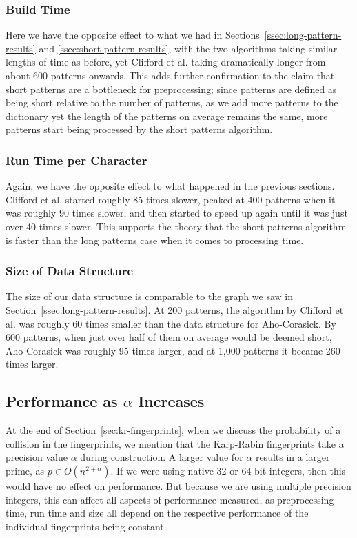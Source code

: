 \documentclass[ %
                    author={Dominic Joseph Moylett},
                    degree={MEng},
                     title={Dictionary Matching with Fingerprints},
                  subtitle={An Empirical Analysis},
                      type={research},
                      year={2015} ]{dissertation}
\begin{document}
\subsubsection{Build Time}

Here we have the opposite effect to what we had in Sections~\ref{ssec:long-pattern-results} and \ref{ssec:short-pattern-results}, with the two algorithms taking similar lengths of time as before, yet Clifford et al. taking dramatically longer from about 600 patterns onwards. This adds further confirmation to the claim that short patterns are a bottleneck for preprocessing; since patterns are defined as being short relative to the number of patterns, as we add more patterns to the dictionary yet the length of the patterns on average remains the same, more patterns start being processed by the short patterns algorithm.

\subsubsection{Run Time per Character}

Again, we have the opposite effect to what happened in the previous sections. Clifford et al. started roughly 85 times slower, peaked at 400 patterns when it was roughly 90 times slower, and then started to speed up again until it was just over 40 times slower. This supports the theory that the short patterns algorithm is faster than the long patterns case when it comes to processing time.

\subsubsection{Size of Data Structure}

The size of our data structure is comparable to the graph we saw in Section~\ref{ssec:long-pattern-results}. At 200 patterns, the algorithm by Clifford et al. was roughly 60 times smaller than the data structure for Aho-Corasick. By 600 patterns, when just over half of them on average would be deemed short, Aho-Corasick was roughly 95 times larger, and at 1,000 patterns it became 260 times larger.

\subsection{Performance as $\alpha$ Increases}

At the end of Section~\ref{sec:kr-fingerprints}, when we discuss the probability of a collision in the fingerprints, we mention that the Karp-Rabin fingerprints take a precision value $\alpha$ during construction. A larger value for $\alpha$ results in a larger prime, as $p \in O(n^{2 + \alpha})$. If we were using native 32 or 64 bit integers, then this would have no effect on performance. But because we are using multiple precision integers, this can affect all aspects of performance measured, as preprocessing time, run time and size all depend on the respective performance of the individual fingerprints being constant.
\end{document}
